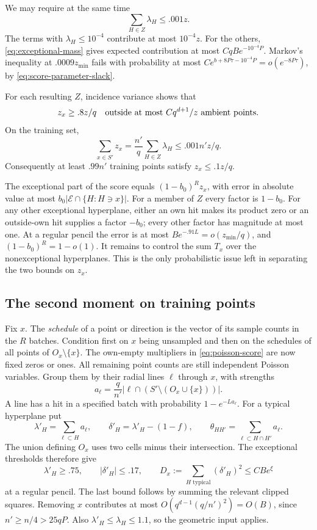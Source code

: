 We may require at the same time
\begin{equation}
 \sum_{H\in Z}\lambda_H\le .001z.
 \label{eq:z-small-mass}
\end{equation}
The terms with \(\lambda_H\le10^{-4}\) contribute at most \(10^{-4}z\).
For the others, \eqref{eq:exceptional-mass} gives expected contribution
at most \(CqBe^{-10^{-4}P}\).  Markov's inequality at
\(.0009z_{\min}\) fails with probability at most
\(Ce^{b+8P\tau-10^{-4}P}=o(e^{-8P\tau})\), by
\eqref{eq:score-parameter-slack}.

For each resulting \(Z\), incidence variance shows that
\begin{equation}
 z_x\ge .8z/q
 \quad\hbox{outside at most }Cq^{d+1}/z\hbox{ ambient points}.
 \label{eq:z-ambient}
\end{equation}
On the training set,
\[
 \sum_{x\in S'}z_x=\frac{n'}q\sum_{H\in Z}\lambda_H\le .001n'z/q.
\]
Consequently at least \(.99n'\) training points satisfy \(z_x\le .1z/q\).


The exceptional part of the score equals \((1-b_0)^Rz_x\), with error in
absolute value at most \(b_0|\mathcal E\cap\{H:H\ni x\}|\).  For a member
of \(Z\) every factor is \(1-b_0\).  For any other exceptional hyperplane,
either an own hit makes its product zero or an outside-own hit supplies a
factor \(-b_0\); every other factor has magnitude at most one.  At a
regular pencil the error is at most \(Be^{-.91L}=o(z_{\min}/q)\), and
\((1-b_0)^R=1-o(1)\).  It remains to control the sum \(T_x\) over the
nonexceptional hyperplanes.  This is the only probabilistic issue left
in separating the two bounds on \(z_x\).

\subsection{The second moment on training points}
\label{subsec:score-second-moment}

Fix \(x\). The \emph{schedule} of a point or direction is the vector of
its sample counts in the $R$ batches. Condition first on \(x\) being
unsampled and then on the schedules of all points of
\(O_x\setminus\{x\}\).  The own-empty
multipliers in \eqref{eq:poisson-score} are now fixed zeros or ones.
All remaining point counts are still independent Poisson variables.
Group them by their radial lines \(\ell\) through \(x\), with strengths
\[
 a_\ell=\frac q{n'}|\ell\cap(S'\setminus(O_x\cup\{x\}))|.
\]
A line has a hit in a specified batch with probability \(1-e^{-La_\ell}\).
For a typical hyperplane put
\[
 \lambda'_H=\sum_{\ell\subset H}a_\ell,\qquad
 \delta'_H=\lambda'_H-(1-f),\qquad
 \theta_{HH'}=\sum_{\ell\subset H\cap H'}a_\ell.
\]
The union defining \(O_x\) uses two cells minus their intersection.
The exceptional thresholds therefore give
\begin{equation}
 \lambda'_H\ge .75,\qquad |\delta'_H|\le .17,\qquad
 D_x:=\sum_{H\text{ typical}}(\delta'_H)^2\le CBe^\xi
 \label{eq:typical-masses}
\end{equation}
at a regular pencil.  The last bound follows by summing the relevant
clipped squares.  Removing \(x\) contributes at most
\(O(q^{d-1}(q/n')^2)=O(B)\), since \(n'\ge n/4>25qP\).
Also \(\lambda'_H\le\lambda_H\le1.1\), so the geometric input applies.

